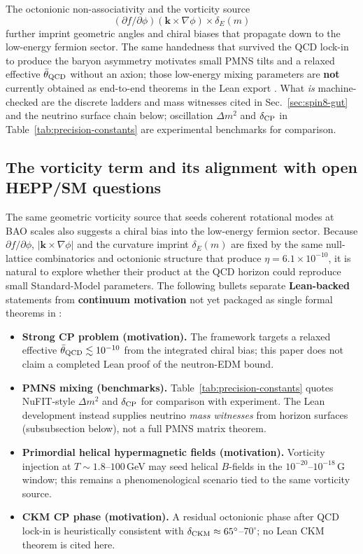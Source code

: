 \documentclass[12pt,a4paper]{article}
\begin{document}
The octonionic non-associativity and the vorticity source
\[
(\partial f/\partial\phi)(\mathbf{k} \times \nabla\phi) \times \delta_E(m)
\]
further imprint geometric angles and chiral biases that propagate down to the low-energy fermion sector. The same handedness that survived the QCD lock-in to produce the baryon asymmetry motivates small PMNS tilts and a relaxed effective $\bar{\theta}_{\rm QCD}$ without an axion; those low-energy mixing parameters are \textbf{not} currently obtained as end-to-end theorems in the Lean export \citep{hqiv-lean}. What \emph{is} machine-checked are the discrete ladders and mass witnesses cited in Sec.~\ref{sec:spin8-gut} and the neutrino surface chain below; oscillation \(\Delta m^2\) and \(\delta_{\rm CP}\) in Table~\ref{tab:precision-constants} are experimental benchmarks for comparison.

\subsection{The vorticity term and its alignment with open HEPP/SM questions}

The same geometric vorticity source that seeds coherent rotational modes at BAO scales also suggests a chiral bias into the low-energy fermion sector. Because $\partial f/\partial\phi$, $|\mathbf{k}\times\nabla\phi|$ and the curvature imprint $\delta_E(m)$ are fixed by the same null-lattice combinatorics and octonionic structure that produce $\eta=6.1\times10^{-10}$, it is natural to explore whether their product at the QCD horizon could reproduce small Standard-Model parameters. The following bullets separate \textbf{Lean-backed} statements from \textbf{continuum motivation} not yet packaged as single formal theorems in \citep{hqiv-lean}:

\begin{itemize}
    \item \textbf{Strong CP problem (motivation).} The framework targets a relaxed effective $\bar{\theta}_{\rm QCD}\lesssim 10^{-10}$ from the integrated chiral bias; this paper does not claim a completed Lean proof of the neutron-EDM bound.
    \item \textbf{PMNS mixing (benchmarks).} Table~\ref{tab:precision-constants} quotes NuFIT-style \(\Delta m^2\) and \(\delta_{\rm CP}\) for comparison with experiment. The Lean development instead supplies neutrino \emph{mass witnesses} from horizon surfaces (subsubsection below), not a full PMNS matrix theorem.
    \item \textbf{Primordial helical hypermagnetic fields (motivation).} Vorticity injection at $T\sim 1.8$--$100$\,GeV may seed helical $B$-fields in the $10^{-20}$--$10^{-18}$\,G window; this remains a phenomenological scenario tied to the same vorticity source.
    \item \textbf{CKM CP phase (motivation).} A residual octonionic phase after QCD lock-in is heuristically consistent with $\delta_{\rm CKM}\approx 65^\circ$--$70^\circ$; no Lean CKM theorem is cited here.
\end{itemize}
\end{document}
